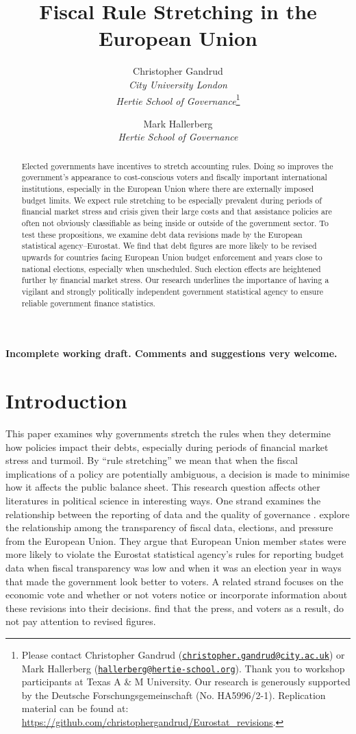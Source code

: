 \documentclass[]{article}
\title{Fiscal Rule Stretching in the European Union}
\author{Christopher Gandrud \\ \emph{City University London} \\ \emph{Hertie School of Governance}\footnote{Please contact Christopher Gandrud
(\href{mailto:christopher.gandrud@city.ac.uk}{\nolinkurl{christopher.gandrud@city.ac.uk}}) or Mark Hallerberg (\href{mailto:hallerberg@hertie-school.org}{\nolinkurl{hallerberg@hertie-school.org}}). Thank you to workshop participants at Texas A \& M University. Our research is generously supported by the Deutsche Forschungsgemeinschaft (No. HA5996/2-1). Replication material can be found at: \url{https://github.com/christophergandrud/Eurostat_revisions}.}
\and
Mark Hallerberg \\ \emph{Hertie School of Governance}}
\begin{document}
\maketitle


\begin{center}
    \textbf{Incomplete working draft. Comments and suggestions very welcome.}
\end{center}

\begin{abstract}
Elected governments have incentives to stretch accounting rules. Doing so improves the government’s appearance to cost-conscious voters and fiscally important international institutions, especially in the European Union where there are externally imposed budget limits. We expect rule stretching to be especially prevalent during periods of financial market stress and crisis given their large costs and that assistance policies are often not obviously classifiable as being inside or outside of the government sector. To test these propositions, we examine debt data revisions made by the European statistical agency--Eurostat. We find that debt figures are more likely to be revised upwards for countries facing European Union budget enforcement and years close to national elections, especially when unscheduled. Such election effects are heightened further by financial market stress. Our research underlines the importance of having a vigilant and strongly politically independent government statistical agency to ensure reliable government finance statistics.
\end{abstract}

\section{Introduction}

This paper examines why governments stretch the rules when they determine how policies impact their debts, especially during periods of financial market stress and turmoil. By ``rule stretching'' we mean that when the fiscal implications of a policy are potentially ambiguous, a decision is made to minimise how it affects the public balance sheet. This research question affects other literatures in political science in interesting ways. One strand examines the relationship between the reporting of data and the quality of governance \cite[e.g.][]{Hollyer2014}. \cite{Alt2014} explore the relationship among the transparency of fiscal data, elections, and pressure from the European Union. They argue that European Union member states were more likely to violate the Eurostat statistical agency's rules for reporting budget data when fiscal transparency was low and when it was an election year in ways that made the government look better to voters. A related strand focuses on the economic vote and whether or not voters notice or incorporate information about these revisions into their decisions. \cite{KayserLeininger2015} find that the press, and voters as a result, do not pay attention to revised figures.
\end{document}
